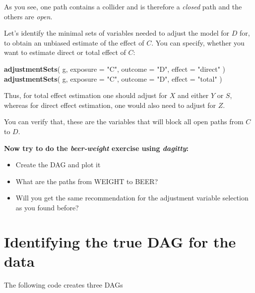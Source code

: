\documentclass[
]{book}
\newenvironment{Shaded}{\begin{snugshade}}{\end{snugshade}}
\newcommand{\AttributeTok}[1]{\textcolor[rgb]{0.13,0.29,0.53}{#1}}
\newcommand{\FunctionTok}[1]{\textcolor[rgb]{0.13,0.29,0.53}{\textbf{#1}}}
\newcommand{\NormalTok}[1]{#1}
\newcommand{\StringTok}[1]{\textcolor[rgb]{0.31,0.60,0.02}{#1}}
\begin{document}
As you see, one path contains a collider and is therefore a \emph{closed} path and the others are \emph{open}.

Let's identify the minimal sets of variables needed to adjust the model for \(D\) for, to obtain an unbiased estimate of the effect of \(C\). You can specify, whether you want to estimate direct or total effect of \(C\):

\begin{Shaded}
\begin{Highlighting}[]
\FunctionTok{adjustmentSets}\NormalTok{(}
\NormalTok{  g, }\AttributeTok{exposure =} \StringTok{"C"}\NormalTok{, }\AttributeTok{outcome =} \StringTok{"D"}\NormalTok{, }\AttributeTok{effect =} \StringTok{"direct"}
\NormalTok{)}
\FunctionTok{adjustmentSets}\NormalTok{(}
\NormalTok{  g, }\AttributeTok{exposure =} \StringTok{"C"}\NormalTok{, }\AttributeTok{outcome =} \StringTok{"D"}\NormalTok{, }\AttributeTok{effect =} \StringTok{"total"}
\NormalTok{)}
\end{Highlighting}
\end{Shaded}

Thus, for total effect estimation one should adjust for \(X\) and either \(Y\) or \(S\), whereas for direct effect estimation, one would also need to adjust for \(Z\).

You can verify that, these are the variables that will block all open paths from \(C\) to \(D\).

\textbf{Now try to do the \emph{beer-weight} exercise using \emph{dagitty}: }

\begin{itemize}
\item
  Create the DAG and plot it
\item
  What are the paths from WEIGHT to BEER?
\item
  Will you get the same recommendation for the adjustment variable selection as you found before?
\end{itemize}

\section{Identifying the true DAG for the data}\label{identifying-the-true-dag-for-the-data}

The following code creates three DAGs
\end{document}
